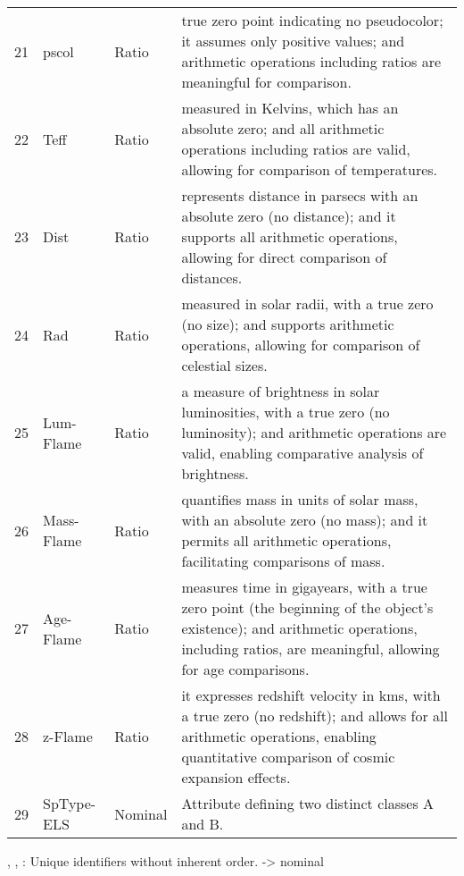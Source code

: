 \begin{table}[]
\begin{tabular}{llll}
21          & pscol                & Ratio                   & true zero point indicating no pseudocolor; it assumes only positive values; and arithmetic operations including ratios are meaningful for comparison. \\
22          & Teff                 & Ratio                   & measured in Kelvins, which has an absolute zero; and all arithmetic operations including ratios are valid, allowing for comparison of temperatures. \\
23          & Dist                 & Ratio                   & represents distance in parsecs with an absolute zero (no distance); and it supports all arithmetic operations, allowing for direct comparison of distances. \\
24          & Rad                  & Ratio                   & measured in solar radii, with a true zero (no size); and supports arithmetic operations, allowing for comparison of celestial sizes. \\
25          & Lum-Flame            & Ratio                   & a measure of brightness in solar luminosities, with a true zero (no luminosity); and arithmetic operations are valid, enabling comparative analysis of brightness. \\
26          & Mass-Flame           & Ratio                   & quantifies mass in units of solar mass, with an absolute zero (no mass); and it permits all arithmetic operations, facilitating comparisons of mass. \\
27          & Age-Flame            & Ratio                   & measures time in gigayears, with a true zero point (the beginning of the object's existence); and arithmetic operations, including ratios, are meaningful, allowing for age comparisons. \\
28          & z-Flame              & Ratio                   & it expresses redshift velocity in km\/s, with a true zero (no redshift); and allows for all arithmetic operations, enabling quantitative comparison of cosmic expansion effects. \\
29          & SpType-ELS           & Nominal                 & Attribute defining two distinct classes A and B. \\
\hline
\end{tabular}
\end{table}



, , : Unique identifiers without inherent order. -> nominal

